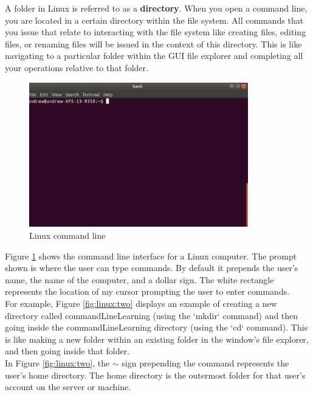   A folder in Linux is referred to as a \textbf{directory}. When you open a command line, you are located in a certain directory within the file system. All commands that you issue that relate to interacting with the file system like creating files, editing files, or renaming files will be issued in the context of this directory. This is like navigating to a particular folder within the GUI file explorer and completing all your operations relative to that folder.

\begin{figure}
	\centering
	\includegraphics[width=0.85\textwidth]{images/commandLineOne.png}
	\caption{Linux command line}
	\label{fig:linux:one}
\end{figure}

Figure \ref{fig:linux:one} shows the command line interface for a Linux computer. The prompt shown is where the user can type commands. By default it prepends the user’s name, the name of the computer, and a dollar sign. The white rectangle represents the location of my cursor prompting the user to enter commands. \\

For example, Figure \ref{fig:linux:two} displays an example of creating a new directory called commandLineLearning (using the `mkdir` command) and then going inside the commandLineLearning directory (using the `cd` command). This is like making a new folder within an existing folder in the window’s file explorer, and then going inside that folder. \\

In Figure \ref{fig:linux:two}, the $\sim$ sign prepending the command represents the user’s home directory. The home directory is the outermost folder for that user’s account on the server or machine. \\

